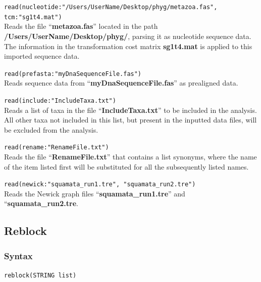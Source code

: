	\begin{example}
	
		\item{\texttt{read(nucleotide:"/Users/UserName/Desktop/phyg/metazoa.fas", 
		tcm:"sg1t4.mat")}\\ Reads the file ``\textbf{metazoa.fas}'' located in the path 
		\textbf{/Users/UserName/Desktop/phyg/}, parsing it as nucleotide sequence 
		data. The information in the transformation cost matrix \textbf{sg1t4.mat} 
		is applied to this imported sequence data.}
		
		\item{\texttt{read(prefasta:"myDnaSequenceFile.fas")}\\ Reads sequence data from 
		``\textbf{myDnaSequenceFile.fas}'' as prealigned data.}
		
		\item{\texttt{read(include:"IncludeTaxa.txt")}\\ Reads a list of taxa in the file 
		``\textbf{IncludeTaxa.txt}'' to be included in the analysis. All other taxa not included 
		in this list, but present in the inputted data files, will be excluded from the analysis.}
		
		\item{\texttt{read(rename:"RenameFile.txt")}\\ Reads the file ``\textbf{RenameFile.txt}'' 
		that contains a list synonyms, where the name of the item listed first will be substituted 
		for all the subsequently listed names. }
		
		\item{\texttt{read(newick:"squamata\_run1.tre", "squamata\_run2.tre")}\\ Reads the
		Newick graph files ``\textbf{squamata\_run1.tre}'' and ``\textbf{squamata\_run2.tre}.}
		
	\end{example}
		
\subsection{Reblock}
\label{subsec:reblock}
	\subsubsection{Syntax}
		\texttt{reblock(STRING list)}
	
